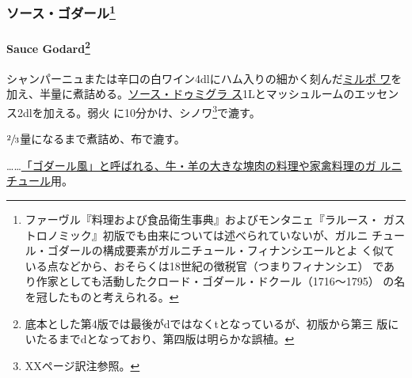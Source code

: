 \documentclass[twoside,12Q,b5j]{escoffierltjsbook}
\renewcommand{\ldots}{…}
\newenvironment{recette}{\begin{small}\begin{spacing}{1}\begin{multicols}{2}}{\end{multicols}\end{spacing}\end{small}}
\begin{document}
\begin{recette}
\subsubsection[ソース・ゴダール]{\texorpdfstring{ソース・ゴダール\footnote{ファーヴル『料理および食品衛生事典』およびモンタニェ『ラルース・
  ガストロノミック』初版でも由来については述べられていないが、ガルニ
  チュール・ゴダールの構成要素がガルニチュール・フィナンシエールとよ
  く似ている点などから、おそらくは18世紀の徴税官（つまりフィナンシエ）
  であり作家としても活動したクロード・ゴダール・ドクール（1716〜1795）
  の名を冠したものと考えられる。}}{ソース・ゴダール}}\label{ux30bdux30fcux30b9ux30b4ux30c0ux30fcux30eb37}

\paragraph[Sauce Godard]{\texorpdfstring{Sauce Godard\footnote{底本とした第4版では最後がdではなくtとなっているが、初版から第三
  版にいたるまでdとなっており、第四版は明らかな誤植。}}{Sauce Godard}}\label{sauce-godart}


シャンパーニュまたは辛口の白ワイン4dlにハム入りの細かく刻んだ\protect\hyperlink{mirepoix}{ミルポ
ワ}を加え、半量に煮詰める。\protect\hyperlink{sauce-demi-glace}{ソース・ドゥミグラ
ス}1Lとマッシュルームのエッセンス2dlを加える。弱火
に10分かけ、シノワ\footnote{XXページ訳注参照。}で漉す。

\(\sfrac{2}{3}\)量になるまで煮詰め、布で漉す。

\ldots{}\ldots{}\protect\hyperlink{garniture-Godard}{「ゴダール風」と呼ばれる、牛・羊の大きな塊肉の料理や家禽料理のガ
ルニチュール}用。

\end{recette}

{\printindex}
\end{document}
